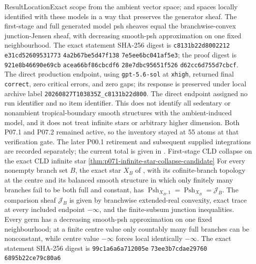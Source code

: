 \begin{AppLProvenanceLedger}{Result}{Location}{Exact scope}
{   from the ambient vector space; and spaces locally identified with these
   models in a way that preserves the generator sheaf.  The first-stage and
   full generated model psh sheaves equal the branchwise-convex
   junction-Jensen sheaf, with decreasing smooth-psh approximation on one fixed
   neighbourhood.  The exact statement SHA-256 digest is
   \texttt{c8131b22d8002212}\allowbreak
   \texttt{e31cd52609531773}\allowbreak
   \texttt{4a2b67be5d47f138}\allowbreak
   \texttt{7e5ee6bc041af5e3}; the proof digest is
   \texttt{921e8b46690e69cb}\allowbreak
   \texttt{acea66bf86cbcdf6}\allowbreak
   \texttt{28e7dbc95651f526}\allowbreak
   \texttt{d62cc6d755d7cbcf}.  The direct production endpoint, using
   \texttt{gpt-5.6-sol} at \texttt{xhigh}, returned final
   \texttt{correct}, zero critical errors, and zero gaps; its response is
   preserved under local archive label
   \nolinkurl{20260827T103835Z_c8131b22d800}.  The direct endpoint assigned
   no run identifier and no item identifier.  This does not identify all
   sedentary or nonambient tropical-boundary smooth structures with the
   ambient-induced model, and it does not treat infinite stars or arbitrary
   higher dimension. Both P07.1 and P07.2 remained active, so the inventory
   stayed at 55 atoms at that verification gate. The later P00.1 retirement
   and subsequent supplied integrations are recorded separately; the current
   total is given in .}
\AppLProvenanceRecord
  {First-stage CLD collapse on the exact CLD infinite star}
  {\cref{thm:p071-infinite-star-collapse-candidate}}
  {For every nonempty branch set \(B\), the exact star \(X_B\) of
   \cite[\S6.7.3]{CLD25}, with its cofinite-branch topology at the centre and
   its balanced smooth structure in which only finitely many branches fail
   to be both full and constant, has
   \(\operatorname{Psh}_{X_B,1}=\operatorname{Psh}_{X_B}=\mathscr J_B\).
   The comparison sheaf \(\mathscr J_B\) is given by branchwise extended-real
   convexity, exact trace at every included endpoint \(-\infty\), and the
   finite-subsum junction inequalities.  Every germ has a decreasing
   smooth-psh approximation on one fixed neighbourhood; at a finite centre
   value only countably many full branches can be nonconstant, while centre
   value \(-\infty\) forces local identically \(-\infty\).  The exact statement
   SHA-256 digest is
   \texttt{99c1a6a6a712005e}\hspace{0pt}
   \texttt{73ee3b7cdae29760}\hspace{0pt}
   \texttt{6895b22ce79c80a6}\hspace{0pt}
}
\end{AppLProvenanceLedger}
